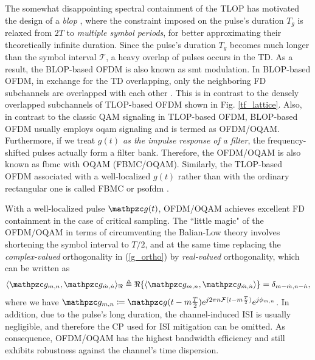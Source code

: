 \documentclass[journal]{IEEEtran}
\begin{document}
The somewhat disappointing spectral containment of the TLOP has motivated the design of a \emph{\ac{blop}} \cite{ofdm_oqam_chang_66,ofdm_oqam_saltzberg_67,ofdm_oqam_hirosaki_81,ofdm_oqam_hirosaki_86,finitepulse_96,oqam_pulse_icc99,ofdm_oqam_siohan_02,fbmcprimer}, where the constraint imposed on the pulse's duration $T_g$ is relaxed from $2T$ to \emph{multiple symbol periods},
for better approximating their theoretically infinite duration. %
Since the pulse's duration $T_g$ becomes much longer than the symbol interval $\mathcal T$, a heavy overlap of pulses occurs in the TD. As a result, the BLOP-based OFDM is also known as \ac{smt} modulation\cite{ofdmvsfbmc,mct}. In BLOP-based OFDM, in exchange for the TD overlapping, only the neighboring FD subchannels are overlapped with each other \cite{ofdm_oqam_chang_66}. This is in contrast  to the densely overlapped subchannels of TLOP-based OFDM shown in Fig. \ref{tf_lattice}.
Also, in contrast to the classic QAM signaling in TLOP-based OFDM, BLOP-based OFDM usually employs \ac{oqam} signaling and is termed as OFDM/OQAM\cite{weinstein2009}. Furthermore, if we treat \emph{$g(t)$ as the impulse response of a filter}, the frequency-shifted pulses actually form a filter bank. Therefore, the OFDM/OQAM is also known as \ac{fbmc} with OQAM (FBMC/OQAM). Similarly, the TLOP-based OFDM associated with a well-localized $g(t)$ rather than with the ordinary rectangular one is called FBMC or \ac{psofdm} \cite{zhao_pulse_2017}.


With a well-localized pulse $\mathpzc g(t)$, OFDM/OQAM achieves excellent FD containment in the case of critical sampling.
The ``little magic" of the OFDM/OQAM in terms of circumventing the Balian-Low theory \cite{oqam_pulse_icc99} involves shortening 
the symbol interval to $T/2$, and at the same time replacing the \emph{complex-valued} orthogonality in (\ref{g_ortho}) by \emph{real-valued} orthogonality, which can be written as \cite{ofdm_oqam_siohan_02}
\begin{equation}\label{r_ortho}
  \langle \mathpzc  g_{m,n}, \mathpzc g_{\dot m,\dot n}\rangle_{\Re} \triangleq \Re\{\langle \mathpzc  g_{m,n}, \mathpzc g_{\dot m,\dot n}\rangle\}=\delta_{m-\dot m,n-\dot n},
\end{equation}
where we have $\mathpzc g_{m,n}\coloneqq \mathpzc g(t-m\frac{T}{2})e^{j2\pi n \mathcal F (t-m\frac{T}{2})}e^{j\phi_{m,n}}$. In addition, due to the pulse's long duration, the channel-induced ISI is usually negligible, and therefore the CP used for ISI mitigation can be omitted. As consequence, OFDM/OQAM has the highest bandwidth efficiency and still exhibits robustness against the channel's time dispersion.
\end{document}
